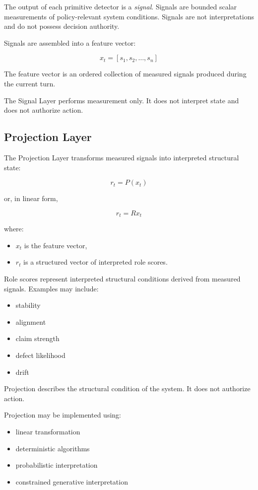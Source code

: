 \documentclass[11pt]{article}
\begin{document}
The output of each primitive detector is a \emph{signal}. Signals are bounded scalar measurements of policy-relevant system conditions. Signals are not interpretations and do not possess decision authority.

Signals are assembled into a feature vector:

\[
x_t = [s_1, s_2, \dots, s_n]
\]

The feature vector is an ordered collection of measured signals produced during the current turn.

The Signal Layer performs measurement only. It does not interpret state and does not authorize action.

\subsection{Projection Layer}

The Projection Layer transforms measured signals into interpreted structural state:

\[
r_t = P(x_t)
\]

or, in linear form,

\[
r_t = R x_t
\]

where:

\begin{itemize}
  \item $x_t$ is the feature vector,
  \item $r_t$ is a structured vector of interpreted role scores.
\end{itemize}

Role scores represent interpreted structural conditions derived from measured signals. Examples may include:

\begin{itemize}
  \item stability
  \item alignment
  \item claim strength
  \item defect likelihood
  \item drift
\end{itemize}

Projection describes the structural condition of the system. It does not authorize action.

Projection may be implemented using:

\begin{itemize}
  \item linear transformation
  \item deterministic algorithms
  \item probabilistic interpretation
  \item constrained generative interpretation
\end{itemize}
\end{document}

